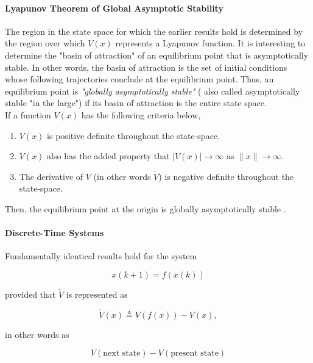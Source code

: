 \documentclass{thesisreport}
\begin{document}
\paragraph{Lyapunov Theorem of Global Asymptotic Stability}

The region in the state space for which the earlier results hold is determined by the region over which $V(x)$ represents a Lyapunov function. It is interesting to determine the "basin of attraction" of an equilibrium point that is asymptotically stable. In other words, the basin of attraction is the set of initial conditions whose following trajectories conclude at the equilibrium point. Thus, an equilibrium point is \textit{"globally asymptotically stable"} ( also called asymptotically stable "in the large") if its basin of attraction is the entire state space.\\

\noindent
If a function $V(x)$ has the following criteria below, 

\begin{enumerate}
	\item $V(x)$ is positive definite throughout the state-space.
	\item $V(x)$ also has the added property that $|V(x)| \rightarrow \infty$ as $\|x\| \rightarrow \infty$.
	\item The derivative of $V$ (in other words $\dot{V}$) is negative definite throughout the state-space.
\end{enumerate}
Then, the equilibrium point at the origin is globally asymptotically stable \cite{Dahleh2011}.

\paragraph{Discrete-Time Systems}

Fundamentally identical results hold for the system

\begin{equation}
x(k+1) = f(x(k))
\end{equation}

provided that $\dot{V}$ is represented as

\begin{equation*}
\dot{V}(x) \triangleq V(f(x)) - V(x),
\end{equation*}

in other words as 

\begin{equation*}
V(\text{next state}) - V(\text{present state})
\end{equation*}
\end{document}

